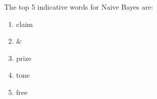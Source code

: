 \begin{answer}
    The top 5 indicative words for Naive Bayes are:  
    \begin{enumerate}
        \item claim
        \item \&
        \item prize
        \item tone
        \item free
    \end{enumerate}
\end{answer}
